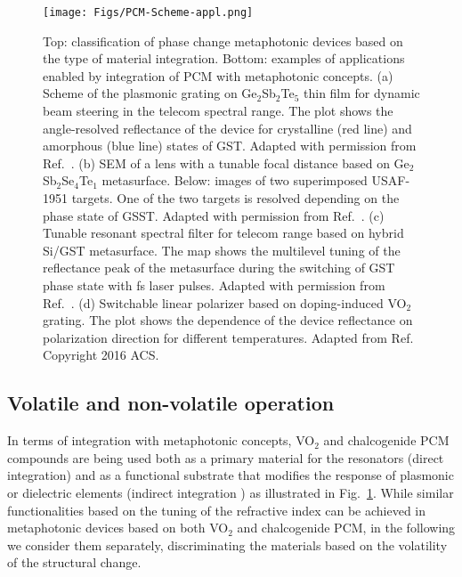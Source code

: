 \documentclass[journal=chreay,manuscript=review]{achemso}
\begin{document}
\begin{figure}
    \centering
    \texttt{[image: Figs/PCM-Scheme-appl.png]}
    \caption{
    Top: classification of phase change metaphotonic devices based on the type of material integration. Bottom: examples of applications enabled by integration of PCM with metaphotonic concepts. (a) Scheme of the plasmonic grating on Ge$_2$Sb$_2$Te$_5$ thin film for dynamic beam steering in the telecom spectral range. The plot shows the angle-resolved reflectance of the device for crystalline (red line) and amorphous (blue line) states of GST. Adapted with permission from Ref.~. (b) SEM of a lens with a tunable focal distance based on Ge$_2$Sb$_2$Se$_4$Te$_1$ metasurface. Below: images of two superimposed USAF-1951 targets. One of the two targets is resolved depending on the phase state of GSST. Adapted with permission from Ref.~. (c) Tunable resonant spectral filter for telecom range based on hybrid Si/GST metasurface. The map shows the multilevel tuning of the reflectance peak of the metasurface during the switching of GST phase state with fs laser pulses.  Adapted with permission from Ref.~. (d) Switchable linear polarizer based on doping-induced  VO$_2$ grating. The plot shows the dependence of the device reflectance on polarization direction for different temperatures. Adapted from Ref.~ Copyright 2016 ACS.}
    \label{fig:PCM-scheme-appl}
\end{figure}

\subsection{Volatile and non-volatile operation}

In terms of integration with metaphotonic concepts, VO$_2$ and chalcogenide PCM compounds are being used both as a primary material for the resonators (direct integration\cite{karvounis2016all,Tian2019active,kepic2021optically}) and as a functional substrate that modifies the response of plasmonic or dielectric elements (indirect integration \cite{galarreta2018nonvolatile,tripathi2021tunable}) as illustrated in Fig.~\ref{fig:PCM-scheme-appl}. While similar functionalities based on the tuning of the refractive index can be achieved in metaphotonic devices based on both VO$_2$ and chalcogenide PCM, in the following we consider them separately, discriminating the materials based on the volatility of the structural change.
\end{document}

